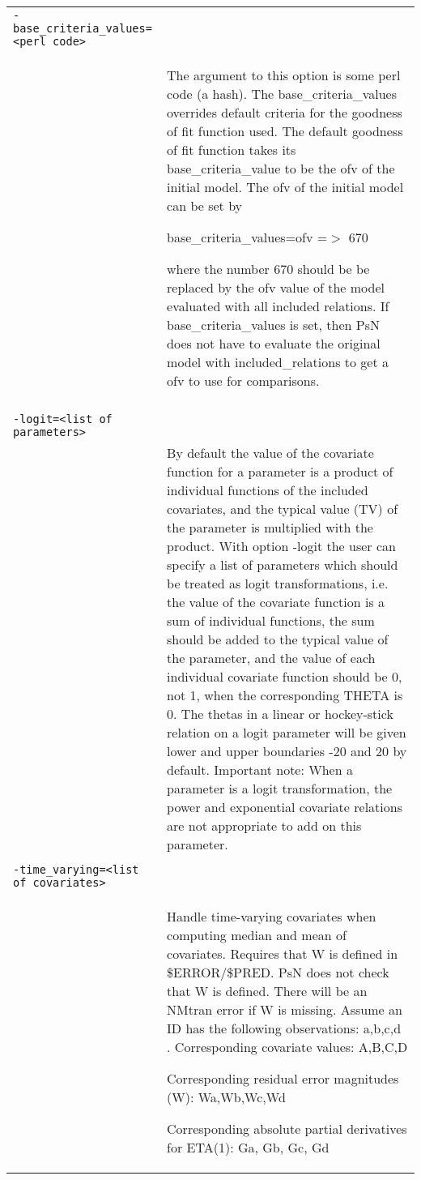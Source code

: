 \documentclass[a4paper,12pt]{article}
\begin{document}
\begin{longtable}{p{1in}p{4in}}
\verb|-base_criteria_values=<perl code>| & \\
\nopagebreak
 & The argument to this option is some perl code (a hash). The base\_criteria\_values overrides default criteria for the goodness of fit function used. The default goodness of fit function takes its base\_criteria\_value to be the ofv of the initial model. The ofv of the initial model  can be set by

base\_criteria\_values={ofv =$>$ 670}

 where the number 670 should be be replaced by the ofv value of the model evaluated with all included relations. If base\_criteria\_values is set, then PsN does not have to evaluate the original model with included\_relations to get a ofv to use for comparisons.\\
\\
\verb|-logit=<list of parameters>| & \\
\nopagebreak
 & By default the value of the covariate function for a parameter is a  product of individual functions of the included covariates, and the typical value (TV) of the parameter is multiplied with the product. With option -logit the user can specify a list of parameters which should be treated as logit transformations, i.e. the value of the covariate function is a sum of individual functions, the sum should be added to the typical value of the parameter, and the value of each individual covariate function should be 0, not 1, when the corresponding THETA is 0. The thetas in a linear or hockey-stick relation on a logit parameter will be given lower and upper boundaries -20 and 20 by default. Important note: When a parameter is a logit transformation, the power and exponential covariate relations are not appropriate to add on this parameter. \\
\\
\verb|-time_varying=<list of covariates>| & \\
\nopagebreak
 & Handle time-varying covariates when computing median and mean of covariates. Requires that W is defined in \$ERROR/\$PRED. PsN does not check that W is defined. There will be an NMtran error if W is missing. Assume an ID has the following observations: a,b,c,d
. 
Corresponding covariate values: A,B,C,D

Corresponding residual error magnitudes (W): Wa,Wb,Wc,Wd

Corresponding absolute partial derivatives for ETA(1): Ga, Gb, Gc, Gd


\end{longtable}
\end{document}
